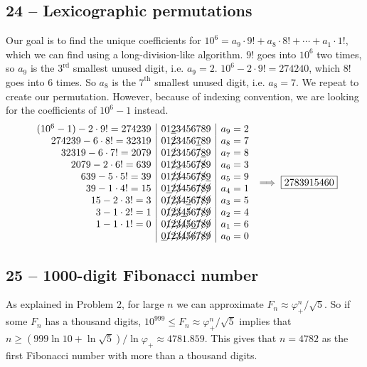 \documentclass{article}
\begin{document}
\subsection*{24 -- Lexicographic permutations}
Our goal is to find the unique coefficients for $10^6 = a_9\cdot9! + a_8\cdot8! + \cdots + a_1\cdot1!$, which we can find using a long-division-like algorithm.
$9!$ goes into $10^6$ two times, so $a_9$ is the $3^\text{rd}$ smallest unused digit, i.e. $a_9 = 2$.
$10^6 - 2 \cdot 9! = 274240$, which $8!$ goes into 6 times.
So $a_8$ is the $7^\text{th}$ smallest unused digit, i.e. $a_8 = 7$.
We repeat to create our permutation.
However, because of indexing convention, we are looking for the coefficients of $10^6 - 1$ instead.
\begin{align*}
	\begin{array}{r | l | l}
	(10^6 - 1) - 2 \cdot 9! = 274239 & 01\underline{2}3456789 & a_9 = 2\\
	274239 - 6 \cdot 8! = 32319 & 01\slashed{2}3456\underline{7}89 & a_8 = 7 \\
	32319 - 6 \cdot 7! = 2079 & 01\slashed{2}3456\slashed{7}\underline{8}9 & a_7 = 8 \\
	2079 - 2 \cdot 6! = 639 & 01\slashed{2}\underline{3}456\slashed{7}\slashed{8}9 & a_6 = 3 \\
	639 - 5 \cdot 5! = 39 & 01\slashed{2}\slashed{3}456\slashed{7}\slashed{8}\underline{9} & a_5 = 9 \\
	39 - 1 \cdot 4! =  15 & 0\underline{1}\slashed{2}\slashed{3}456\slashed{7}\slashed{8}\slashed{9} & a_4 = 1 \\
	15 - 2 \cdot 3! = 3 & 0\slashed{1}\slashed{2}\slashed{3}4\underline{5}6\slashed{7}\slashed{8}\slashed{9} & a_3 = 5 \\
	3 - 1 \cdot 2! = 1 & 0\slashed{1}\slashed{2}\slashed{3}\underline{4}\slashed{5}6\slashed{7}\slashed{8}\slashed{9} & a_2 = 4 \\
	1 - 1 \cdot 1! = 0 & 0\slashed{1}\slashed{2}\slashed{3}\slashed{4}\slashed{5}\underline{6}\slashed{7}\slashed{8}\slashed{9} & a_1 = 6 \\
	& \underline{0}\slashed{1}\slashed{2}\slashed{3}\slashed{4}\slashed{5}\slashed{6}\slashed{7}\slashed{8}\slashed{9} & a_0 = 0
	\end{array} \implies \boxed{ 2783915460}
\end{align*}


\subsection*{25 -- 1000-digit Fibonacci number}
As explained in Problem 2, for large $n$ we can approximate $F_n \approx \varphi_+^n / \sqrt{5}$.
So if some $F_n$ has a thousand digits, $10^{999} \leq F_n \approx \varphi_+^n / \sqrt{5}$ implies that $n \geq (999 \ln 10 + \ln \sqrt{5})/ \ln \varphi_+ \approx 4781.859$.
This gives that $n = \boxed{4782}$ as the first Fibonacci number with more than a thousand digits.
\end{document}
